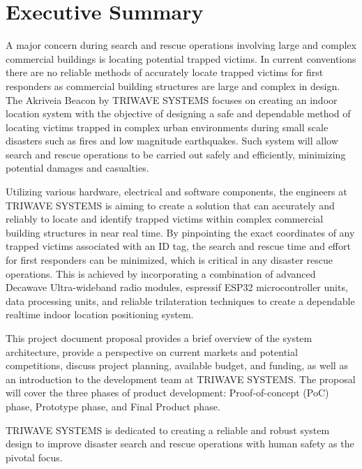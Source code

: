 

\section*{Executive Summary}	%
\bigskip
A major concern during search and rescue operations involving large and complex commercial buildings is locating potential trapped victims. In current conventions there are no reliable methods of accurately locate trapped victims for first responders as commercial building structures are large and complex in design. The Akriveia Beacon by TRIWAVE SYSTEMS focuses on creating an indoor location system with the objective of designing a safe and dependable method of locating victims trapped in complex urban environments during small scale disasters such as fires and low magnitude earthquakes. Such system will allow search and rescue operations to be carried out safely and efficiently, minimizing potential damages and casualties.

\bigskip
Utilizing various hardware, electrical and software components, the engineers at TRIWAVE SYSTEMS is aiming to create a solution that can accurately and reliably to locate and identify trapped victims within complex commercial building structures in near real time. By pinpointing the exact coordinates of any trapped victims associated with an ID tag, the search and rescue time and effort for first responders can be minimized, which is critical in any disaster rescue operations. This is achieved by incorporating a combination of advanced Decawave Ultra-wideband radio modules, espressif ESP32 microcontroller units, data processing units, and reliable trilateration techniques to create a dependable realtime indoor location positioning system.

\bigskip
This project document proposal provides a brief overview of the system architecture, provide a perspective on current markets and potential competitions, discuss project planning, available budget, and funding, as well as an introduction to the development team at TRIWAVE SYSTEMS. The proposal will cover the three phases of product development: Proof-of-concept (PoC) phase, Prototype phase, and Final Product phase.

\bigskip
TRIWAVE SYSTEMS is dedicated to creating a reliable and robust system design to improve disaster search and rescue operations with human safety as the pivotal focus.
